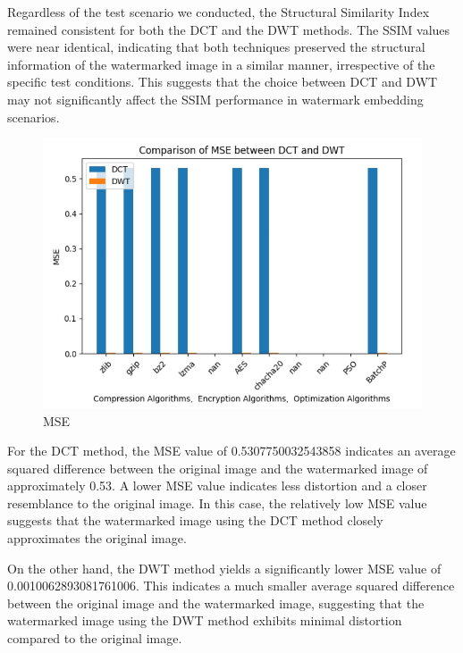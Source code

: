 \documentclass[conference]{IEEEtran}
\begin{document}
Regardless of the test scenario we conducted, the Structural Similarity Index remained consistent for both the DCT and the DWT methods. The SSIM values were near identical, indicating that both techniques preserved the structural information of the watermarked image in a similar manner, irrespective of the specific test conditions. This suggests that the choice between DCT and DWT may not significantly affect the SSIM performance in watermark embedding scenarios.

\begin{figure}[htbp]
\centering
\includegraphics[width=0.9\columnwidth]{MSE.jpg}
\caption{MSE}
\label{fig}
\end{figure}

\vspace{80pt}

For the DCT method, the MSE value of 0.5307750032543858 indicates an average squared difference between the original image and the watermarked image of approximately 0.53. A lower MSE value indicates less distortion and a closer resemblance to the original image. In this case, the relatively low MSE value suggests that the watermarked image using the DCT method closely approximates the original image.

On the other hand, the DWT method yields a significantly lower MSE value of 0.0010062893081761006. This indicates a much smaller average squared difference between the original image and the watermarked image, suggesting that the watermarked image using the DWT method exhibits minimal distortion compared to the original image.
\end{document}
